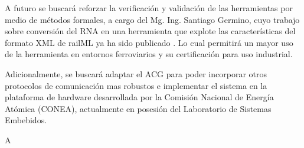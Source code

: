 A futuro se buscará reforzar la verificación y validación de las herramientas por medio de métodos formales, a cargo del Mg. Ing. Santiago Germino, cuyo trabajo sobre conversión del RNA en una herramienta que explote las características del formato XML de railML ya ha sido publicado \cite{Paper_207}. Lo cual permitirá un mayor uso de la herramienta en entornos ferroviarios y su certificación para uso industrial.

Adicionalmente, se buscará adaptar el ACG para poder incorporar otros protocolos de comunicación mas robustos e implementar el sistema en la plataforma de hardware desarrollada por la Comisión Nacional de Energía Atómica (CONEA), actualmente en posesión del Laboratorio de Sistemas Embebidos.

A\\
\cite{Paper_1}\cite{Paper_3}\cite{Paper_6}\cite{Paper_7}\cite{Paper_10}\cite{Paper_11}\cite{Paper_14}\cite{Paper_16}\cite{Paper_18}\cite{Paper_20}\\
\cite{Paper_27}\cite{Paper_33}\cite{Paper_39}\cite{Paper_40}\cite{Paper_44}\cite{Paper_45}\cite{Paper_48}\cite{Paper_50}\cite{Paper_59}\cite{Paper_51}\\
\cite{Paper_55}\cite{Paper_57}\cite{Paper_58}\cite{Paper_60}\cite{Paper_61}\cite{Paper_63}\cite{Paper_67}\cite{Paper_52}\\



\cite{Paper_56}\cite{Paper_62}\\
\cite{Paper_69}\cite{Paper_85}\cite{Paper_90}\cite{Paper_91}\cite{Paper_92}\cite{Paper_93}\cite{Paper_104}\cite{Paper_105}\cite{Paper_106}\cite{Paper_108}\\
\cite{Paper_110}\cite{Paper_111}\cite{Paper_113}\cite{Paper_119}\cite{Paper_121}\cite{Paper_129}\cite{Paper_134}\cite{Paper_137}\cite{Paper_139}\\
\cite{Paper_145}\cite{Paper_147}\cite{Paper_148}\cite{Paper_152}\cite{Paper_153}\cite{Paper_166}\cite{Paper_167}\cite{Paper_172}\cite{Paper_173}\\
\cite{Paper_174}\cite{Paper_177}\cite{Paper_178}\\

